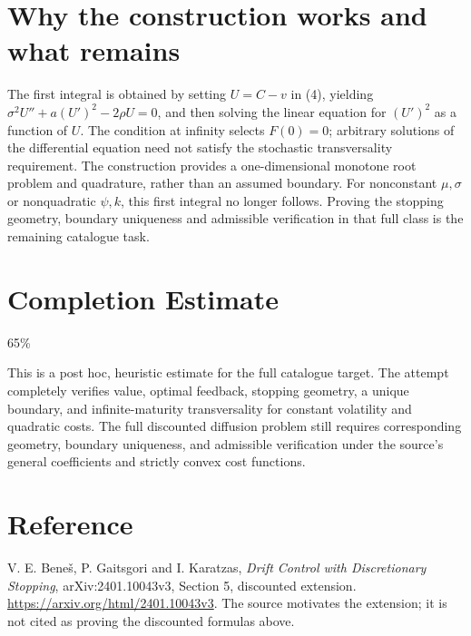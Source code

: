 \documentclass[11pt,a4paper]{article}
\theoremstyle{definition}
\theoremstyle{remark}
\begin{document}
\section{Why the construction works and what remains}
The first integral is obtained by setting $U=C-v$ in (4), yielding
$\sigma^2U''+a(U')^2-2\rho U=0$, and then solving the linear equation for $(U')^2$ as a function of $U$. The condition at infinity selects $F(0)=0$; arbitrary solutions of the differential equation need not satisfy the stochastic transversality requirement. The construction provides a one-dimensional monotone root problem and quadrature, rather than an assumed boundary. For nonconstant $\mu,\sigma$ or nonquadratic $\psi,k$, this first integral no longer follows. Proving the stopping geometry, boundary uniqueness and admissible verification in that full class is the remaining catalogue task.

\section{Completion Estimate}
65\%

This is a post hoc, heuristic estimate for the full catalogue target.
The attempt completely verifies value, optimal feedback, stopping geometry, a unique boundary, and infinite-maturity transversality for constant volatility and quadratic costs. The full discounted diffusion problem still requires corresponding geometry, boundary uniqueness, and admissible verification under the source's general coefficients and strictly convex cost functions.

\section{Reference}
V. E. Bene\v{s}, P. Gaitsgori and I. Karatzas, \emph{Drift Control with Discretionary Stopping}, arXiv:2401.10043v3, Section 5, discounted extension. \url{https://arxiv.org/html/2401.10043v3}. The source motivates the extension; it is not cited as proving the discounted formulas above.
\end{document}
